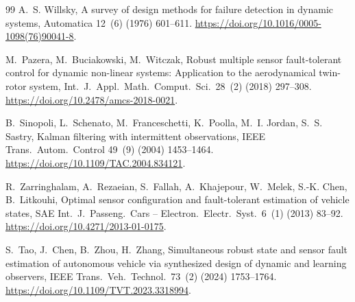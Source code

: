 \documentclass[preprint,12pt,authoryear=false]{elsarticle}
\theoremstyle{remark}\newtheorem{remark}{Remark}
\theoremstyle{plain}\newtheorem{proposition}{Proposition}\newtheorem{lemma}{Lemma}
\theoremstyle{definition}\newtheorem{assumption}{Assumption}
\begin{document}
\begin{thebibliography}{99}
A.~S. Willsky,
A survey of design methods for failure detection in dynamic systems,
Automatica 12~(6) (1976) 601--611.
\url{https://doi.org/10.1016/0005-1098(76)90041-8}.

M.~Pazera, M.~Buciakowski, M.~Witczak,
Robust multiple sensor fault-tolerant control for dynamic non-linear systems: Application to the aerodynamical twin-rotor system,
Int.\ J.\ Appl.\ Math.\ Comput.\ Sci.\ 28~(2) (2018) 297--308.
\url{https://doi.org/10.2478/amcs-2018-0021}.

B.~Sinopoli, L.~Schenato, M.~Franceschetti, K.~Poolla, M.~I. Jordan, S.~S. Sastry,
Kalman filtering with intermittent observations,
IEEE Trans.\ Autom.\ Control 49~(9) (2004) 1453--1464.
\url{https://doi.org/10.1109/TAC.2004.834121}.

R.~Zarringhalam, A.~Rezaeian, S.~Fallah, A.~Khajepour, W.~Melek, S.-K. Chen, B.~Litkouhi,
Optimal sensor configuration and fault-tolerant estimation of vehicle states,
SAE Int.\ J.\ Passeng.\ Cars -- Electron.\ Electr.\ Syst.\ 6~(1) (2013) 83--92.
\url{https://doi.org/10.4271/2013-01-0175}.

S.~Tao, J.~Chen, B.~Zhou, H.~Zhang,
Simultaneous robust state and sensor fault estimation of autonomous vehicle via synthesized design of dynamic and learning observers,
IEEE Trans.\ Veh.\ Technol.\ 73~(2) (2024) 1753--1764.
\url{https://doi.org/10.1109/TVT.2023.3318994}.

\end{thebibliography}
\end{document}
